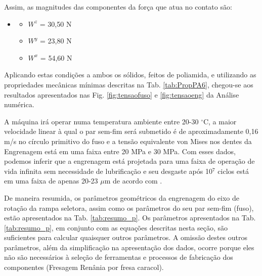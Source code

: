 Assim, as magnitudes das componentes da força que atua no contato são:

\begin{itemize}
\item []
    \begin{itemize}
        \item $W^z$ = 30,50 N
        \item $W^y$ = 23,80 N
        \item $W^x$ = 54,60 N
    \end{itemize}
\end{itemize} 

Aplicando estas condições a ambos os sólidos, feitos de poliamida, e utilizando as propriedades mecânicas mínimas descritas na Tab. \ref{tab:PropPA6}, chegou-se aos resultados apresentados nas Fig. \ref{fig:tensaofuso} e \ref{fig:tensaoeng} da Análise numérica.

A máquina irá operar numa temperatura ambiente entre 20-30 $^{\circ}$C, a maior velocidade linear à qual o par sem-fim será submetido é de aproximadamente 0,16 m/s no círculo primitivo do fuso e a tensão equivalente von Mises nos dentes da Engrenagem está em uma faixa entre 20 MPa e 30 MPa. Com esses dados, podemos inferir que a engrenagem está projetada para uma faixa de operação de vida infinita sem necessidade de lubrificação e seu desgaste após 10$^7$ ciclos está em uma faixa de apenas 20-23 $\mu$m de acordo com \cite{starzhinsky2013}.

De maneira resumida, os parâmetros geométricos da engrenagem do eixo de rotação da rampa seletora, assim como os parâmetros do seu par sem-fim (fuso), estão apresentados na Tab. \ref{tab:resumo_p}. Os parâmetros apresentados na Tab. \ref{tab:resumo_p}, em conjunto com as equações descritas nesta seção, são suficientes para calcular quaisquer outros parâmetros. A omissão destes outros parâmetros, além da simplificação na apresentação dos dados, ocorre porque eles não são necessários à seleção de ferramentas e processos de fabricação dos componentes (Fresagem Renânia por fresa caracol).

